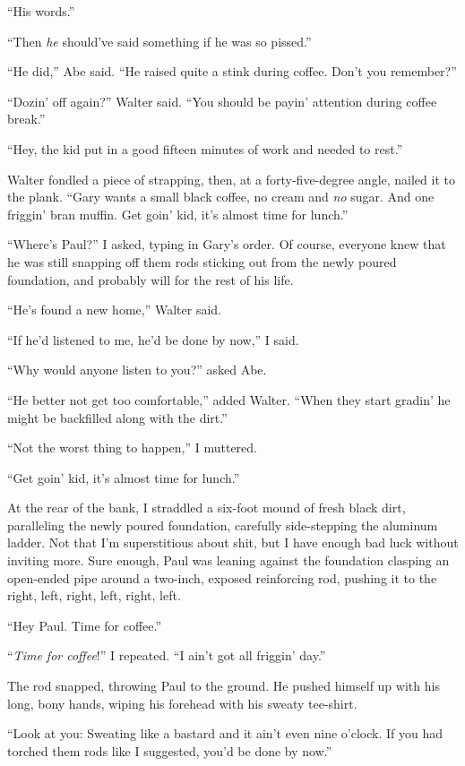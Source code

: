 ``His words.''

``Then \emph{he} should've said something if he was so pissed.'' ~

``He did,'' Abe said. ``He raised quite a stink during coffee. Don't you
remember?''

``Dozin' off again?'' Walter said. ``You should be payin' attention
during coffee break.''

``Hey, the kid put in a good fifteen minutes of work and needed to
rest.'' ~

Walter fondled a piece of strapping, then, at a forty-five-degree angle,
nailed it to the plank. ``Gary wants a small black coffee, no cream and
\emph{no} sugar. And one friggin' bran muffin. Get goin' kid, it's
almost time for lunch.''

``Where's Paul?'' I asked, typing in Gary's order. Of course, everyone
knew that he was still snapping off them rods sticking out from the
newly poured foundation, and probably will for the rest of his life.

``He's found a new home,'' Walter said.

``If he'd listened to me, he'd be done by now,'' I said. ~

``Why would anyone listen to you?'' asked Abe. ~

``He better not get too comfortable,'' added Walter. ``When they start
gradin' he might be backfilled along with the dirt.''

``Not the worst thing to happen,'' I muttered.

``Get goin' kid, it's almost time for lunch.''

At the rear of the bank, I straddled a six-foot mound of fresh black
dirt, paralleling the newly poured foundation, carefully side-stepping
the aluminum ladder. Not that I'm superstitious about shit, but I have
enough bad luck without inviting more. Sure enough, Paul was leaning
against the foundation clasping an open-ended pipe around a two-inch,
exposed reinforcing rod, pushing it to the right, left, right, left,
right, left. ~~~~

``Hey Paul. Time for coffee.''

``\emph{Time for coffee}!'' I repeated. ``I ain't got all friggin'
day.''

The rod snapped, throwing Paul to the ground. He pushed himself up with
his long, bony hands, wiping his forehead with his sweaty tee-shirt. ~~

``Look at you: Sweating like a bastard and it ain't even nine o'clock.
If you had torched them rods like I suggested, you'd be done by now.''

